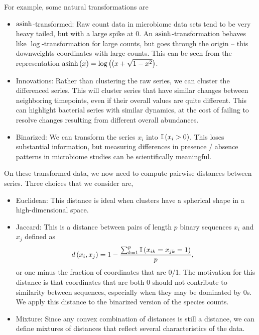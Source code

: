 \documentclass{article}
\begin{document}
For example, some natural transformations are
\begin{itemize}
\item $\mathop\mathrm{asinh}$-transformed: Raw count data in microbiome data sets tend to
  be very heavy tailed, but with a large spike at 0. An $\mathop\mathrm{asinh}$-transformation
  behaves like $\log$-transformation for large counts, but goes through the
  origin -- this downweights coordinates with large counts. This can be seen
  from the representation $\mathop\mathrm{asinh}\left(x\right) = \log\left((x + \sqrt{1 -
      x^{2}}\right)$.
\item Innovations: Rather than clustering the raw series, we can cluster the
  differenced series. This will cluster series that have similar changes between
  neighboring timepoints, even if their overall values are quite different. This
  can highlight bacterial series with similar dynamics, at the cost of failing
  to resolve changes resulting from different overall abundances.
\item Binarized: We can transform the series $x_{i}$ into $\mathbb{I}\left({x_{i} > 0}\right)$.
  This loses substantial information, but measuring differences in presence /
  absence patterns in microbiome studies can be scientifically meaningful.
\end{itemize}

On these transformed data, we now need to compute pairwise distances between
series. Three choices that we consider are,
\begin{itemize}
\item Euclidean: This distance is ideal when clusters have a spherical shape in
  a high-dimensional space.
\item Jaccard: This is a distance between pairs of length $p$ binary sequences
  $x_{i}$ and $x_{j}$ defined as
\begin{align*}
  d\left(x_{i}, x_{j}\right) &= 1 - \frac{\sum_{k = 1}^{p} \mathbb{I}\left({x_{ik} = x_{jk} = 1}\right)}{p},
\end{align*}
or one minus the fraction of coordinates that are 0/1. The motivation for this
distance is that coordinates that are both 0 should not contribute to similarity
between sequences, especially when they may be dominated by 0s. We apply this
distance to the binarized version of the species counts.
\item Mixture: Since any convex combination of distances is still a distance, we
  can define mixtures of distances that reflect several characteristics of the
  data.
\end{itemize}
\end{document}
